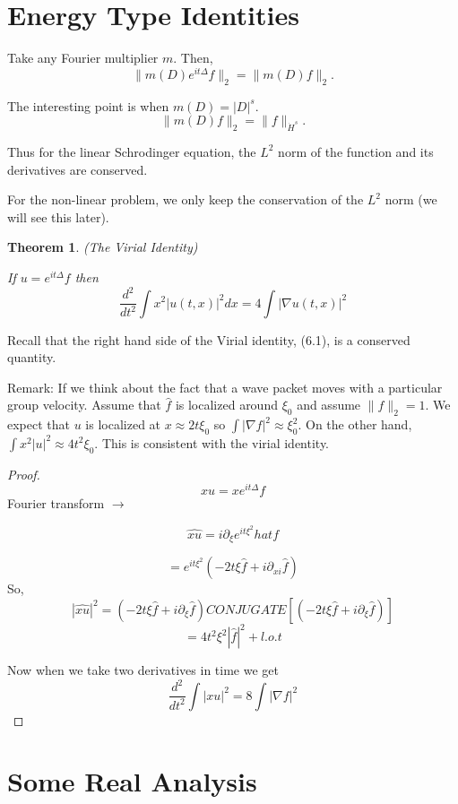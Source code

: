 \documentclass[11pt]{amsart}
\theoremstyle{plain}
\numberwithin{equation}{section}
\newtheorem{thm}{Theorem}[section]
\theoremstyle{remark}
\begin{document}
\section{Energy Type Identities}

Take any Fourier multiplier $m.$  Then, $$\| m(D)e^{it\Delta}f\|_2= \| m(D)f \|_{2}.$$

The interesting point is when $m(D)=|D|^s.$ $$\| m(D)f \|_2 = \| f \|_{\dot{H}^s}.$$

Thus for the linear Schrodinger equation, the $L^2$ norm of the function and its derivatives are conserved. 

For the non-linear problem, we only keep the conservation of the $L^2$ norm (we will see this later). 

\begin{thm} (The Virial Identity)

If $u=e^{it\Delta} f$ then \begin{equation} \frac{d^2} {dt^2} \int x^2 |u(t,x)|^2 dx = 4\int |\nabla u(t,x)|^2 \end{equation}

\end{thm}
Recall that the right hand side of the Virial identity, (6.1), is  a conserved quantity. 

Remark: If we think about the fact that a wave packet moves with a particular group velocity. Assume that $\hat{f}$ is localized around  $\xi_0$ and assume $\|f\|_2=1.$ We expect that $u$ is localized at $x\approx 2t\xi_0$ so $\int|\nabla f|^2 \approx \xi_0^2.$ On the other hand, $\int x^2 |u|^2 \approx 4t^2 \xi_{0}.$ This is consistent with the virial identity.   

\begin{proof} 
$$xu=xe^{it\Delta}f$$
Fourier transform $\rightarrow $

$$\hat{xu} = i\partial_{\xi} e^{it\xi^2}hat{f}$$

$$= e^{it\xi^2}(-2t\xi \hat{f}+i\partial_{xi} \hat{f})$$
So, $$|\hat{xu}|^2= (-2t\xi\hat{f}+i\partial_{\xi}\hat{f}) CONJUGATE[(-2t\xi\hat{f}+i\partial_\xi \hat{f})]$$
$$=4t^2 \xi^2 |\hat{f}|^2+l.o.t$$

Now when we take two derivatives in time we get $$\frac{d^2}{dt^2} \int |xu|^2 = 8 \int |\nabla f|^2$$
\end{proof}

\section{Some Real Analysis}
\end{document}
